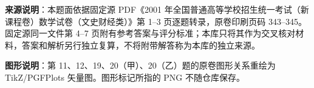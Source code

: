 


\begin{gktip}
\textbf{来源说明}：本题面依据固定源 PDF《2001 年全国普通高等学校招生统一考试（新课程卷）数学试卷（文史财经类）》第 1–3 页逐题转录，原卷印刷页码 343–345。固定源同一文件第 4–7 页附有参考答案与评分标准；本库只将其作为交叉核对材料，答案和解析另行独立复算，不将附带解答称为本库的独立来源。

\textbf{图形说明}：第 11、12、19、20（甲）、20（乙）题的原卷图形关系重绘为 TikZ/PGFPlots 矢量图。图形标记所指的 PNG 不随仓库保存。
\end{gktip}


